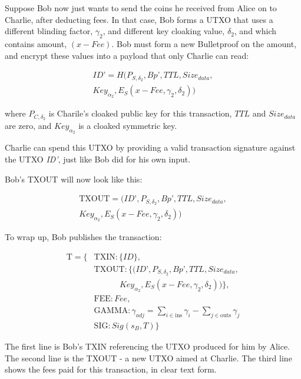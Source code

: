 \documentclass[8pt,fleqn,openany]{book}
\begin{document}
{		Suppose Bob now just wants to send the coins he received from Alice on to Charlie, after deducting fees. In that case, Bob forms a UTXO that uses a different blinding factor, $\gamma_2$, and different key cloaking value, $\delta_2$, and which contains amount, $(x - \mathit{Fee})$. Bob must form a new Bulletproof on the amount, and encrypt these values into a payload that only Charlie can read:
		
		\begin{multline*}
		ID’ = H(P_{S, \delta_2}, Bp’, TTL, Size_{data}, \\
		Key_{\alpha_2}, E_S(x - Fee, \gamma_2, \delta_2))
		\end{multline*}
		
		where $P_{C, \delta_2}$ is Charile’s cloaked public key for this transaction, $TTL$ and $Size_{data}$ are zero, and $Key_{\alpha_2}$ is a cloaked symmetric key. 
		
		Charlie can spend this UTXO by providing a valid transaction signature against the UTXO \textit{ID’}, just like Bob did for his own input. 
		
		Bob’s TXOUT will now look like this:
		
		\begin{multline*}
		\text{TXOUT} = (ID’, P_{S, \delta_2}, Bp’, TTL, Size_{data},\\ 
		Key_{\alpha_2}, E_S(x - Fee, \gamma_2, \delta_2))
		\end{multline*}
		
		To wrap up, Bob publishes the transaction:
		
		\begin{align*}
		\text{T} = \{&\text{TXIN} : \{\mathit{ID}\}, \\
		&\text{TXOUT} : \{(ID’, P_{S, \delta_2}, Bp’, TTL, Size_{data}, \\
		& \ \ \ \ \ \ \ \ \ \ \ \ \ \ Key_{\alpha_2}, E_S(x - Fee, \gamma_2, \delta_2))\}, \\
		&\text{FEE} : \mathit{Fee}, \\
		&\text{GAMMA} : \gamma_{\mathit{adj}} = \sum_{i \in \text{ins}}{\gamma_i} - \sum_{j \in \text{outs}}{\gamma_j}\\
		&\text{SIG} : \mathit{Sig}(s_B, T)\}
		\end{align*}
		
		The first line is Bob’s TXIN referencing the UTXO produced for him by Alice. The second line is the TXOUT - a new UTXO aimed at Charlie. The third line shows the fees paid for this transaction, in clear text form. 
		
}
\end{document}
